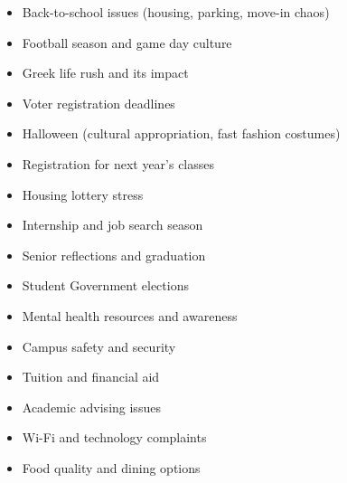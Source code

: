 \documentclass[12pt]{article}
\begin{document}
\begin{seasonbox}
\begin{itemize}[leftmargin=*]
    \item Back-to-school issues (housing, parking, move-in chaos)
    \item Football season and game day culture
    \item Greek life rush and its impact
    \item Voter registration deadlines
    \item Halloween (cultural appropriation, fast fashion costumes)
\end{itemize}
\end{seasonbox}

\begin{seasonbox}
\begin{itemize}[leftmargin=*]
    \item Registration for next year's classes
    \item Housing lottery stress
    \item Internship and job search season
    \item Senior reflections and graduation
    \item Student Government elections
\end{itemize}
\end{seasonbox}

\begin{seasonbox}
\begin{itemize}[leftmargin=*]
    \item Mental health resources and awareness
    \item Campus safety and security
    \item Tuition and financial aid
    \item Academic advising issues
    \item Wi-Fi and technology complaints
    \item Food quality and dining options
\end{itemize}
\end{seasonbox}
\end{document}
